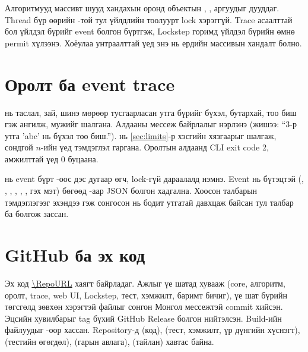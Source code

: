 Алгоритмууд массивт шууд хандахын оронд  объектын , ,  аргуудыг
дууддаг. Thread бүр өөрийн -той тул үйлдлийн тоолуурт lock хэрэггүй. Trace асаалттай бол үйлдэл бүрийг
event болгон бүртгэж, Lockstep горимд үйлдэл бүрийн өмнө permit хүлээнэ. Хоёулаа унтраалттай үед энэ нь ердийн
массивын хандалт болно.

\section{Оролт ба event trace}
 нь таслал, зай, шинэ мөрөөр тусгаарласан утга бүрийг бүхэл, бутархай, тоо биш гэж ангилж,
 мужийг шалгана. Алдааны мессеж байрлалыг нэрлэнэ (жишээ: “3-р утга 'abc' нь бүхэл тоо биш.”).
 нь \ref{sec:limits}-р хэсгийн хязгаарыг шалгаж, сондгой $n$-ийн үед тэмдэглэл гаргана. Оролтын
алдаанд CLI exit code 2, амжилттай үед 0 буцаана.

 нь event бүрт -оос дэс дугаар өгч, lock-гүй дараалалд нэмнэ. Event нь
 бүтэцтэй (, , , , ,
,  гэх мэт) бөгөөд -аар JSON болгон хадгална. Хоосон талбарын
тэмдэглэгээг эхэндээ  гэж сонгосон нь бодит утгатай давхцаж байсан тул  талбар
ба  болгож зассан.

\section{GitHub ба эх код}
Эх код \url{\RepoURL} хаягт байрладаг. Ажлыг үе шатад хувааж (core, алгоритм, оролт, trace,
web UI, Lockstep, тест, хэмжилт, баримт бичиг), үе шат бүрийн төгсгөлд зөвхөн хэрэгтэй файлыг сонгон Монгол
мессежтэй commit хийсэн. Эцсийн хувилбарыг  tag бүхий GitHub Release болгон нийтэлсэн. Build-ийн файлуудыг -оор хассан.
Repository-д  (код),  (тест, хэмжилт, үр дүнгийн хүснэгт),  (тестийн
өгөгдөл),  (гарын авлага),  (тайлан) хавтас байна.
